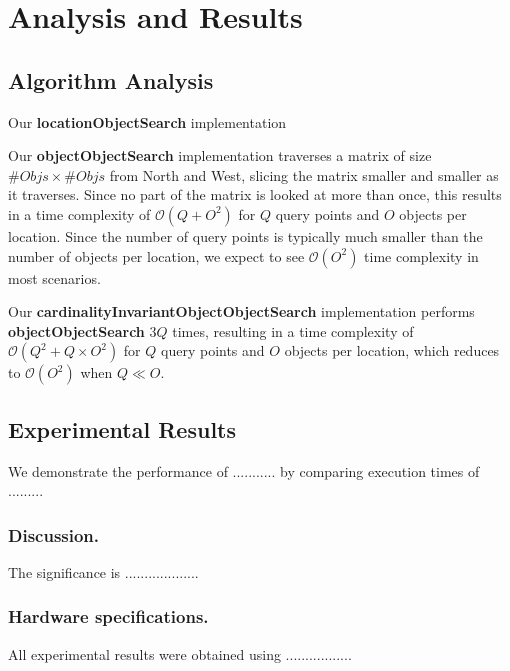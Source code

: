 \section{Analysis and Results}
\label{section:results}

\subsection{Algorithm Analysis}

Our \textbf{locationObjectSearch} implementation 

Our \textbf{objectObjectSearch} implementation traverses a matrix of size $\# Objs \times \# Objs$ from North and West, slicing the matrix smaller and smaller as it traverses. Since no part of the matrix is looked at more than once, this results in a time complexity of $\mathcal{O}(Q + O^2)$ for $Q$ query points and $O$ objects per location. Since the number of query points is typically much smaller than the number of objects per location, we expect to see $\mathcal{O}(O^2)$ time complexity in most scenarios.

Our \textbf{cardinalityInvariantObjectObjectSearch} implementation performs \textbf{objectObjectSearch} $3Q$ times, resulting in a time complexity of $\mathcal{O}(Q^2 + Q\times O^2)$ for $Q$ query points and $O$ objects per location, which reduces to $\mathcal{O}(O^2)$ when $Q \ll O$. 


\subsection{Experimental Results}
We demonstrate the performance of ........... by comparing execution times of ......... 

\subsubsection{Discussion.} 
The significance is ...................

\subsubsection{Hardware specifications.} 
All experimental results were obtained using .................

